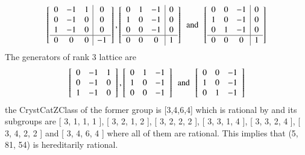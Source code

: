 $$
\left[ \begin {array}{ccc|c} 0&-1&1&0\\ 0&-1&0&0
\\ 1&-1&0&0\\ \hline 0&0&0&-1\end {array}
 \right], 
 \left[ \begin {array}{ccc|c} 0&1&-1&0\\ 1&0&-1&0
\\ 0&0&-1&0\\ \hline 0&0&0&1\end {array}
 \right] 
 \,\,\, \text{and} \,\,\,
 \left[ \begin {array}{ccc|c} 0&0&-1&0\\ 1&0&-1&0
\\ 0&1&-1&0\\ \hline 0&0&0&1\end {array}
 \right] 
$$
The generators of rank 3 lattice are 
$$
 \left[ \begin {array}{ccc} 0&-1&1\\ 0&-1&0
\\ 1&-1&0\end {array} \right], 
 \left[ \begin {array}{ccc} 0&1&-1\\ 1&0&-1
\\ 0&0&-1\end {array} \right]
\,\,\, \text{and} \,\,\, 
 \left[ \begin {array}{ccc} 0&0&-1\\ 1&0&-1
\\ 0&1&-1\end {array} \right] 
$$
the CrystCatZClass of the former group is [3,4,6,4] which is rational by \cite{Kunyavski} and its subgroups are  [ 3, 1, 1, 1 ], [ 3, 2, 1, 2 ], [ 3, 2, 2, 2 ], [ 3, 3, 1, 4 ], [ 3, 3, 2, 4 ], [ 3, 4, 2, 2 ] and  [ 3, 4, 6, 4 ] where all of them are rational. This implies that (5, 81, 54) is hereditarily rational.
